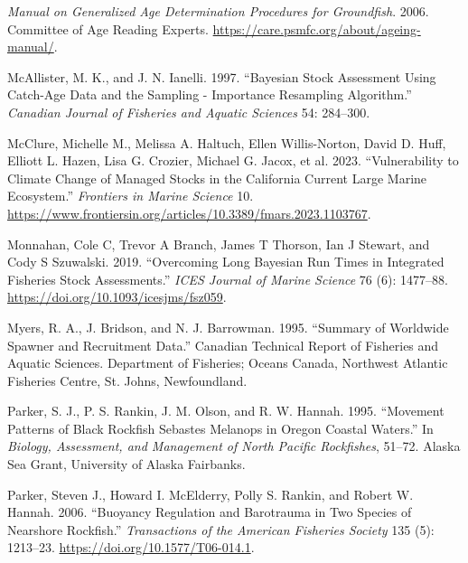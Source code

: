 \documentclass[11pt,
  english,
  letterpaper,
]{article}
\newlength{\cslhangindent}
\newenvironment{CSLReferences}[2] %
 {%
  \setlength{\parindent}{0pt}
  \ifodd #1 \everypar{\setlength{\hangindent}{\cslhangindent}}\ignorespaces\fi
  \ifnum #2 > 0
  \setlength{\parskip}{#2\baselineskip}
  \fi
 }%
 {}
\begin{document}
\begin{CSLReferences}{1}{0}
\leavevmode{}%
\emph{Manual on Generalized Age Determination Procedures for Groundfish}. 2006. Committee of Age Reading Experts. \url{https://care.psmfc.org/about/ageing-manual/}.

\leavevmode{}%
McAllister, M. K., and J. N. Ianelli. 1997. {``Bayesian Stock Assessment Using Catch-Age Data and the Sampling - Importance Resampling Algorithm.''} \emph{Canadian Journal of Fisheries and Aquatic Sciences} 54: 284--300.

\leavevmode{}%
McClure, Michelle M., Melissa A. Haltuch, Ellen Willis-Norton, David D. Huff, Elliott L. Hazen, Lisa G. Crozier, Michael G. Jacox, et al. 2023. {``Vulnerability to Climate Change of Managed Stocks in the California Current Large Marine Ecosystem.''} \emph{Frontiers in Marine Science} 10. \url{https://www.frontiersin.org/articles/10.3389/fmars.2023.1103767}.

\leavevmode{}%
Monnahan, Cole C, Trevor A Branch, James T Thorson, Ian J Stewart, and Cody S Szuwalski. 2019. {``Overcoming Long Bayesian Run Times in Integrated Fisheries Stock Assessments.''} \emph{{ICES} Journal of Marine Science} 76 (6): 1477--88. \url{https://doi.org/10.1093/icesjms/fsz059}.

\leavevmode{}%
Myers, R. A., J. Bridson, and N. J. Barrowman. 1995. {``Summary of Worldwide Spawner and Recruitment Data.''} Canadian Technical Report of Fisheries and Aquatic Sciences. Department of Fisheries; Oceans Canada, Northwest Atlantic Fisheries Centre, St. Johns, Newfoundland.

\leavevmode{}%
Parker, S. J., P. S. Rankin, J. M. Olson, and R. W. Hannah. 1995. {``Movement Patterns of Black Rockfish Sebastes Melanops in Oregon Coastal Waters.''} In \emph{Biology, Assessment, and Management of North Pacific Rockfishes}, 51--72. Alaska Sea Grant, University of Alaska Fairbanks.

\leavevmode{}%
Parker, Steven J., Howard I. McElderry, Polly S. Rankin, and Robert W. Hannah. 2006. {``Buoyancy Regulation and Barotrauma in Two Species of Nearshore Rockfish.''} \emph{Transactions of the American Fisheries Society} 135 (5): 1213--23. \url{https://doi.org/10.1577/T06-014.1}.


\end{CSLReferences}
\end{document}
